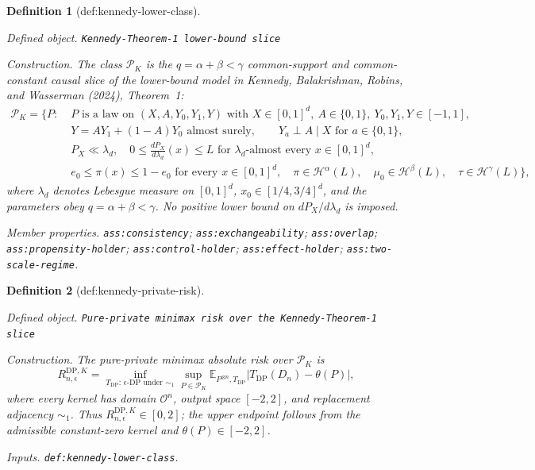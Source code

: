 \documentclass{article}
\newtheorem{definition}{Definition}
\begin{document}
\begin{definition}[def:kennedy-lower-class]\label{def:kennedy-lower-class}
\par\smallskip\noindent\emph{Defined object.} \texttt{Kennedy-\allowbreak{}Theorem-\allowbreak{}1 lower-\allowbreak{}bound slice}
\par\smallskip\noindent\emph{Construction.} The class \(\mathcal P_K\) is the \(q=\alpha+\beta<\gamma\) common-support and common-constant causal slice of the lower-bound model in Kennedy, Balakrishnan, Robins, and Wasserman (2024), Theorem~1:
\[
\begin{split}
\mathcal P_K=\bigl\{P:\;&P\text{ is a law on }(X,A,Y_0,Y_1,Y)\text{ with }X\in[0,1]^d,
\ A\in\{0,1\},\ Y_0,Y_1,Y\in[-1,1],\\
&Y=AY_1+(1-A)Y_0\text{ almost surely},\qquad
Y_a\perp A\mid X\text{ for }a\in\{0,1\},\\
&P_X\ll\lambda_d,\quad
0\le \frac{dP_X}{d\lambda_d}(x)\le L
\text{ for }\lambda_d\text{-almost every }x\in[0,1]^d,\\
&e_0\le\pi(x)\le1-e_0\text{ for every }x\in[0,1]^d,\quad
\pi\in\mathcal H^\alpha(L),\quad
\mu_0\in\mathcal H^\beta(L),\quad
\tau\in\mathcal H^\gamma(L)\bigr\},
\end{split}
\]
where \(\lambda_d\) denotes Lebesgue measure on \([0,1]^d\), \(x_0\in[1/4,3/4]^d\), and the parameters obey \(q=\alpha+\beta<\gamma\).  No positive lower bound on \(dP_X/d\lambda_d\) is imposed.
\par\smallskip\noindent\emph{Member properties.} \texttt{ass:\allowbreak{}consistency}; \texttt{ass:\allowbreak{}exchangeability}; \texttt{ass:\allowbreak{}overlap}; \texttt{ass:\allowbreak{}propensity-\allowbreak{}holder}; \texttt{ass:\allowbreak{}control-\allowbreak{}holder}; \texttt{ass:\allowbreak{}effect-\allowbreak{}holder}; \texttt{ass:\allowbreak{}two-\allowbreak{}scale-\allowbreak{}regime}.
\end{definition}

\begin{definition}[def:kennedy-private-risk]\label{def:kennedy-private-risk}
\par\smallskip\noindent\emph{Defined object.} \texttt{Pure-\allowbreak{}private minimax risk over the Kennedy-\allowbreak{}Theorem-\allowbreak{}1 slice}
\par\smallskip\noindent\emph{Construction.} The pure-private minimax absolute risk over \(\mathcal P_K\) is
\[
R_{n,\epsilon}^{\mathrm{DP},K}
=\inf_{T_{\mathrm{DP}}:\,\epsilon\text{-DP under }\sim_1}
\sup_{P\in\mathcal P_K}
\mathbb E_{P^{\otimes n},T_{\mathrm{DP}}}
\left|T_{\mathrm{DP}}(D_n)-\theta(P)\right|,
\]
where every kernel has domain \(\mathcal O^n\), output space \([-2,2]\), and replacement adjacency \(\sim_1\).  Thus \(R_{n,\epsilon}^{\mathrm{DP},K}\in[0,2]\); the upper endpoint follows from the admissible constant-zero kernel and \(\theta(P)\in[-2,2]\).
\par\smallskip\noindent\emph{Inputs.} \texttt{def:\allowbreak{}kennedy-\allowbreak{}lower-\allowbreak{}class}.
\end{definition}
\end{document}
